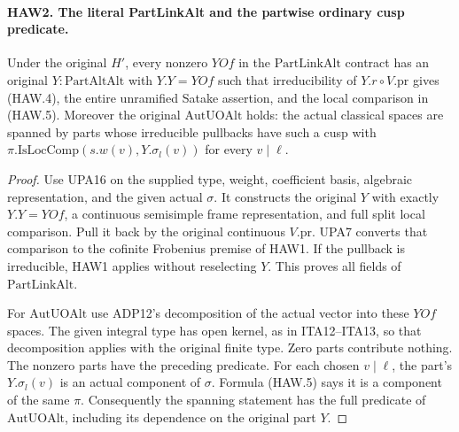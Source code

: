 \paragraph{HAW2. The literal PartLinkAlt and the partwise ordinary cusp predicate.}
\label{claim:HAW2}
Under the original $H'$, every nonzero $YOf$ in the
$\mathrm{PartLinkAlt}$ contract has an original
$Y:\mathrm{PartAltAlt}$ with $Y.Y=YOf$ such that irreducibility
of $Y.r\circ V.\mathrm{pr}$ gives (HAW.4), the entire
unramified Satake assertion, and the local comparison in
(HAW.5).  Moreover the original $\mathrm{AutUOAlt}$ holds:
the actual classical spaces are spanned by parts whose
irreducible pullbacks have such a cusp with
$\pi.\mathrm{IsLocComp}(s.w(v),Y.\sigma_l(v))$ for every
$v\mid\ell$.
\begin{proof}
Use UPA16 on the supplied type, weight, coefficient basis,
algebraic representation, and the given actual $\sigma$.
It constructs the original $Y$ with exactly $Y.Y=YOf$, a
continuous semisimple frame representation, and full split
local comparison.  Pull it back by the original continuous
$V.\mathrm{pr}$.  UPA7 converts that comparison to the
cofinite Frobenius premise of HAW1.  If the pullback is
irreducible, HAW1 applies without reselecting $Y$.
This proves all fields of $\mathrm{PartLinkAlt}$.

For $\mathrm{AutUOAlt}$ use ADP12's decomposition of the
actual vector into these $YOf$ spaces.  The given integral
type has open kernel, as in ITA12--ITA13, so that decomposition
applies with the original finite type.  Zero parts contribute
nothing.  The nonzero parts have the preceding predicate.
For each chosen $v\mid\ell$, the part's $Y.\sigma_l(v)$
is an actual component of $\sigma$.  Formula (HAW.5) says it
is a component of the same $\pi$.  Consequently the spanning
statement has the full predicate of $\mathrm{AutUOAlt}$,
including its dependence on the original part $Y$.
\end{proof}

